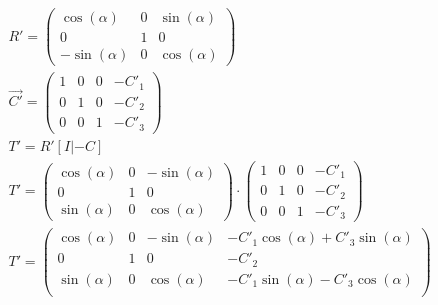 

\begin{gather}			
	R'= 
	\begin{pmatrix}
		\cos(\alpha)&0&\sin(\alpha)\\
		0&1&0\\
		-\sin(\alpha)&0&\cos(\alpha)
	\end{pmatrix}\\
	\vec{C'}= 
	\begin{pmatrix}
		1&0&0&-C'_1\\
		0&1&0&-C'_2\\
		0&0&1&-C'_3			
	\end{pmatrix}\\
	T'=R'[I|-C]\\
	T'=		\begin{pmatrix}
		\cos(\alpha)&0&-\sin(\alpha)\\
		0&1&0\\
		\sin(\alpha)&0&\cos(\alpha)
	\end{pmatrix} 
	\cdot
	\begin{pmatrix}
		1&0&0&-C'_1\\
		0&1&0&-C'_2\\
		0&0&1&-C'_3			
	\end{pmatrix}\\
	T'=
	\begin{pmatrix}
		\cos(\alpha)&0&-\sin(\alpha)&-C'_1\cos(\alpha)+C'_3\sin(\alpha)\\
		0&1&0&-C'_2\\
		\sin(\alpha)&0&\cos(\alpha)&-C'_1\sin(\alpha)-C'_3\cos(\alpha)\\
	\end{pmatrix}
\end{gather}\\





